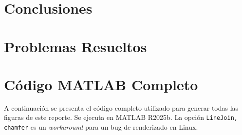 \documentclass[12pt,a4paper]{article}
\begin{document}
\section{Conclusiones}


\section{Problemas Resueltos}


\appendix
\section{C\'odigo MATLAB Completo}

A continuaci\'on se presenta el c\'odigo completo utilizado para generar todas las figuras de este reporte. Se ejecuta en MATLAB R2025b. La opci\'on \texttt{LineJoin, chamfer} es un \textit{workaround} para un bug de renderizado en Linux.
\end{document}
